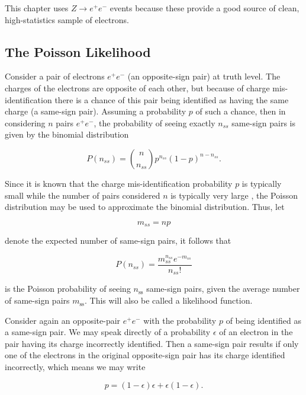 This chapter uses $Z\to e^+e^-$ events because these provide a good source of
clean, high-statistics sample of electrons.


\subsection{The Poisson Likelihood}\label{s:cpllh}

Consider a pair of electrons $e^+e^-$ (an opposite-sign pair) at truth level.
The charges of the electrons are opposite of each other, but because of charge
mis-identification there is a chance of this pair being identified as having
the same charge (a same-sign pair). Assuming a probability $p$ of such a
chance, then in considering $n$ pairs $e^+e^-$, the probability of seeing
exactly $n_{ss}$ same-sign pairs is given by the binomial distribution

$$
	P(n_{ss}) = \binom{n}{n_{ss}}p^{n_{ss}}(1-p)^{n-n_{ss}}.
$$

Since it is known that the charge mis-identification probability $p$ is
typically small while the number of pairs considered $n$ is typically very
large , the Poisson distribution may be used to approximate the binomial
distribution. Thus, let

\begin{equation}\label{eq:cmss}
	m_{ss} = np
\end{equation}

denote the expected number  of same-sign pairs, it follows that



\begin{equation}\label{eq:cpoissonn}
	P(n_{ss}) = \frac{m_{ss}^{n_{ss}} e^{-m_{ss}}}{n_{ss}!}
\end{equation}

is the Poisson probability of seeing $n_{\text{ss}}$ same-sign pairs, given the
average number of same-sign pairs $m_{\text{ss}}$. This will also be called a
likelihood function.

Consider again an opposite-pair $e^+e^-$ with the probability $p$ of being
identified as a same-sign pair. We may speak directly of a probability
$\epsilon$ of an electron in the pair having its charge incorrectly identified.
Then a same-sign pair results if only one of the electrons in the original
opposite-sign pair has its charge identified incorrectly, which means we may
write

\begin{equation}\label{eq:cprobpair}
	p = (1-\epsilon)\epsilon +  \epsilon(1-\epsilon).
\end{equation}


